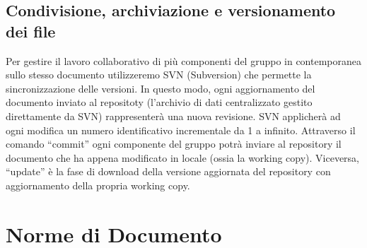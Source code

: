 \documentclass[11pt,titlepage,a4paper]{report}
\begin{document}
\section{Condivisione, archiviazione e versionamento dei file}
Per gestire il lavoro collaborativo di pi\`u componenti del gruppo in contemporanea sullo stesso documento utilizzeremo SVN (Subversion) che permette la sincronizzazione delle versioni. In questo modo, ogni aggiornamento del documento inviato al repositoty (l'archivio di dati centralizzato gestito direttamente da SVN) rappresenter\`a una nuova revisione. SVN applicher\`a ad ogni modifica un numero identificativo incrementale da 1 a infinito. Attraverso il comando ``commit'' ogni componente del gruppo potr\`a inviare al repository il documento che ha appena modificato in locale (ossia la working copy). Viceversa, ``update'' \`e la fase di download della versione aggiornata del repository con aggiornamento della propria working copy. 



\chapter{Norme di Documento}
\end{document}
